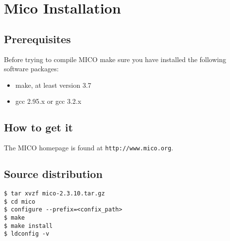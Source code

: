\chapter{Mico Installation}
\begin{flushright}
{\it }
\end{flushright}

\section{Prerequisites}

Before trying to compile MICO make sure you have installed the following
software packages:
\begin{itemize}
\item make, at least version 3.7
\item gcc 2.95.x or gcc 3.2.x 
\end{itemize}


\section{How to get it}

The MICO homepage is found at
{\tt http://www.mico.org}. 


\section{Source distribution}

\begin{verbatim}
$ tar xvzf mico-2.3.10.tar.gz
$ cd mico
$ configure --prefix=<confix_path> 
$ make
$ make install
$ ldconfig -v
\end{verbatim}